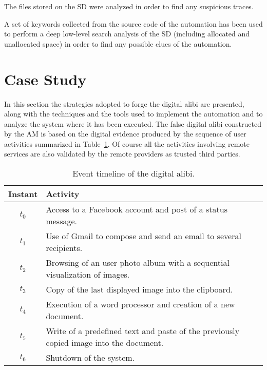 \documentclass[10pt, conference]{IEEEtran}
\begin{document}
 The files stored on the SD were analyzed in order to find any suspicious traces.

 A set of keywords collected from the source code of the automation has been used to perform
a deep low-level search analysis of the SD (including allocated and unallocated space) in order to find any possible clues of the automation.


\section{Case Study}
\label{sec:casestudy}

In this section the strategies adopted to forge the digital alibi are presented, along with the techniques and the tools used to
implement the automation and to analyze the system where it has been executed.
The false digital alibi constructed by the AM is based on the digital evidence produced by the sequence of user activities
summarized in Table~\ref{tab:timeline}. Of course all the activities involving remote services are also validated by the
remote providers as trusted third parties. 


\begin{center}
\begin{table}[h!]
\caption{Event timeline of the digital alibi.}
 \begin{tabular}{| c | p{7cm} |}
  \hline
  \textbf{Instant} & \textbf{Activity}\\
  \hline
  $t_0$ & Access to a Facebook account and post of a status message.\\
  \hline
  $t_1$ & Use of Gmail to compose and send an email to several recipients.\\
  \hline
  $t_2$ & Browsing of an user photo album with a sequential visualization of images.\\
  \hline
  $t_3$ & Copy of the last displayed image into the clipboard.\\
  \hline
  $t_4$ & Execution of a word processor and creation of a new document.\\
  \hline
  $t_5$ & Write of a predefined text and paste of the previously copied image into the document.\\
  \hline
  $t_6$ & Shutdown of the system.\\
  \hline
 \end{tabular}
\label{tab:timeline}
\end{table}
\end{center}
\end{document}
